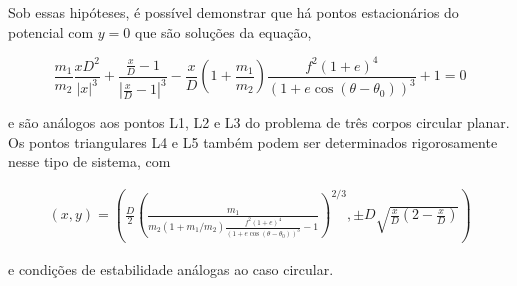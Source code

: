 Sob essas hipóteses, é possível demonstrar \cite{nonsyncbin} que há pontos estacionários do potencial com $y = 0$ que são soluções da equação,

\begin{equation}
    \frac{m_1}{m_2}\frac{xD^2}{|x|^3}+\frac{\frac{x}{D}-1}{|\frac{x}{D}-1|^3}-\frac{x}{D}\left(1+\frac{m_1}{m_2}\right)\frac{f^2(1+e)^4}{(1+e\cos(\theta - \theta_0))^3}+1=0
\end{equation}

e são análogos aos pontos L1, L2 e L3 do problema de três corpos circular planar. Os pontos triangulares L4 e L5 também podem ser determinados rigorosamente nesse tipo de sistema, com

\begin{align}
    (x, y) = \left(\frac{D}{2}\left(\frac{m_1}{m_2(1 + m_1/m_2)\frac{f^2(1+e)^4}{(1+e\cos(\theta - \theta_0))^3} - 1}\right)^{2/3},\pm D\sqrt{\frac{x}{D}\left(2 - \frac{x}{D}\right)}\right)
\end{align}

e condições de estabilidade análogas ao caso circular.